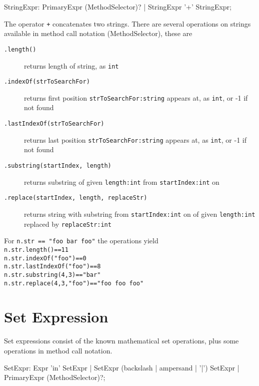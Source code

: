 \begin{rail}
  StringExpr: PrimaryExpr (MethodSelector)? | StringExpr '+' StringExpr;
\end{rail}
The operator \texttt{+} concatenates two strings.
There are several operations on strings available in method call notation (MethodSelector), these are

\begin{description}
\item[\texttt{.length()}] returns length of string, as \texttt{int}
\item[\texttt{.indexOf(strToSearchFor)}] returns first position \texttt{strToSearchFor:string} appears at, as \texttt{int}, or -1 if not found
\item[\texttt{.lastIndexOf(strToSearchFor)}] returns last position \texttt{strToSearchFor:string} appears at, as \texttt{int}, or -1 if not found
\item[\texttt{.substring(startIndex, length)}] returns substring of given \texttt{length:int} from \texttt{startIndex:int} on
\item[\texttt{.replace(startIndex, length, replaceStr)}] returns string with substring from \texttt{startIndex:int} on of given \texttt{length:int} replaced by \texttt{replaceStr:int}
\end{description}

\begin{example}
For \texttt{n.str == "foo bar foo"} the operations yield \\
\texttt{n.str.length()==11} \\
\texttt{n.str.indexOf("foo")==0} \\
\texttt{n.str.lastIndexOf("foo")==8} \\
\texttt{n.str.substring(4,3)=="bar"} \\
\texttt{n.str.replace(4,3,"foo")=="foo foo foo"} \\
\end{example}


\section{Set Expression}\label{sec:setexpr}

Set expressions consist of the known mathematical set operations, plus some operations in method call notation.

\begin{rail}
  SetExpr: Expr 'in' SetExpr | SetExpr (backslash | ampersand | '|') SetExpr | PrimaryExpr (MethodSelector)?;
\end{rail}

